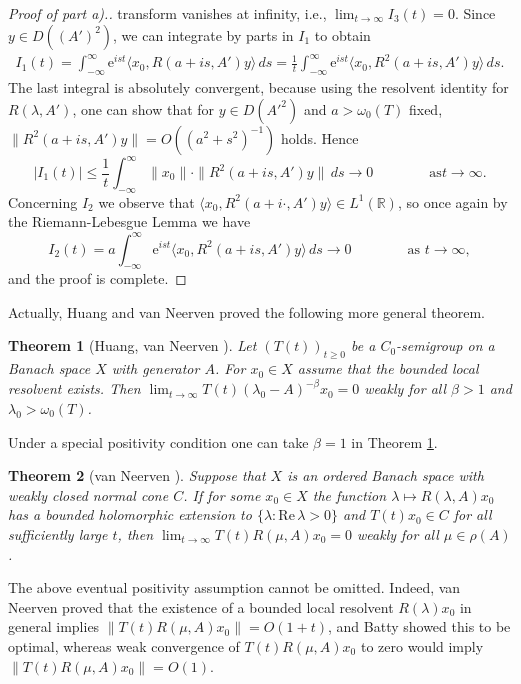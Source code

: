 \documentclass[11pt,intlimits, draft,oneside]{amsart}
\newtheorem{thm}{Theorem}[section]
\theoremstyle{definition}
\renewcommand{\Re}{\mathrm{Re}\,}
\def\dd{\,d}
\def\ee{\mathrm{e}}
\def\RR{\mathbb{R}}
\def\lm{\rightarrow}
\def\la{\langle}
\def\ra{\rangle}
\begin{document}
\begin{proof}[Proof of part a).]
transform vanishes at infinity, i.e., $\lim_{t\to\infty} I_3(t)= 0$.
Since $y\in D((A')^2)$,  we can integrate by parts in $I_1$ to
obtain
\begin{align*}
I_1(t)=\int_{-\infty}^{\infty} \ee^{i st}\la x_0,R(a+i s,A')y\ra\dd
s=\frac{1}{t}\int_{-\infty}^{\infty} \ee^{i st}\la x_0,R^2(a+i
s,A')y\ra\dd s.
\end{align*}
The last integral is absolutely convergent, because using the
resolvent identity for $R(\lambda, A')$, one can show that for $y\in
D({A'}^2)$ and $a>\omega_0(T)$ fixed, $\|R^2(a+i
s,A')y\|=O(({a^2+s^2})^{-1})$ holds. Hence
\begin{equation*}
|I_1(t)|\leq\frac{1}{t}\int_{-\infty}^{\infty} \|
x_0\|\cdot\|R^2(a+i s,A')y\|\dd s\lm 0\qquad\qquad\mbox{as
$t\lm\infty$}.
\end{equation*}
Concerning $I_2$ we observe that  $\la x_0,R^2(a+i \cdot,A')y\ra\in
L^1(\RR)$, so once again by the Riemann-Lebesgue Lemma we have
\begin{equation*}
I_2(t)=a\int_{-\infty}^{\infty} \ee^{i st} \la x_0,R^2(a+i
s,A')y\ra\dd s \lm 0\qquad\qquad\mbox{as $t\lm\infty$},
\end{equation*}
and the proof is complete.
\end{proof}

\smallskip
\noindent Actually, Huang and van Neerven
 proved the following more general
theorem.

\begin{thm}[{Huang, van Neerven \cite{huang/vanneerven:1999}}] \label{thm:weakstab:beta}
 Let $(T(t))_{t \geq 0}$ be a $C_0$-semigroup on a Banach
space $X$ with generator $A$. For $x_0 \in X$ assume that the
bounded local resolvent exists. Then $\lim_{t\to\infty}
T(t)(\lambda_0-A)^{-\beta}x_0 =0$ weakly for all $\beta>1$ and
$\lambda_0 > \omega_0(T)$.
\end{thm}


Under a special positivity condition one can take $\beta=1$ in
Theorem \ref{thm:weakstab:beta}.
\begin{thm}[{van Neerven \cite{vanneerven:2002}}]\label{thm:one}
Suppose that $X$ is an ordered Banach space with weakly closed
normal cone $C$. If for some $x_0\in X$ the function $\lambda
\mapsto R(\lambda,A)x_0$ has a bounded holomorphic extension to
$\{\lambda:\Re\lambda > 0\}$ and $T(t)x_0\in C$ for all sufficiently
large $t$, then $\lim_{t\to\infty} T(t)R(\mu,A)x_0 =0$ weakly for
all $\mu\in\rho(A)$.
\end{thm}
\noindent The above eventual positivity assumption cannot be
omitted. Indeed, van Neerven \cite{vanneerven:2002} proved that the
existence of a bounded local resolvent $R(\lambda)x_0$ in general implies
$\|T(t)R(\mu, A)x_0\|=O(1+t)$, and Batty
\cite{batty:2003} showed this to be optimal, whereas weak
convergence of $T(t)R(\mu, A)x_0$ to zero would imply $\|T(t)R(\mu,
A)x_0\|=O(1)$.
\end{document}
